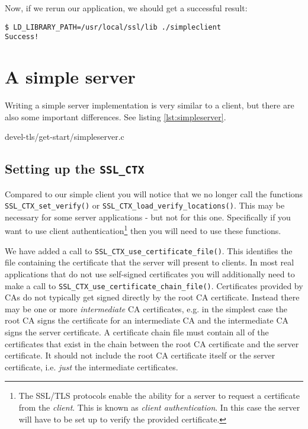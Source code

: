 Now, if we rerun our application, we should get a successful result:

\begin{verbatim}
$ LD_LIBRARY_PATH=/usr/local/ssl/lib ./simpleclient
Success!
\end{verbatim}

\section{A simple server}

Writing a simple server implementation is very similar to a client, but there 
are also some important differences. See listing \ref{lst:simpleserver}.


{devel-tls/get-start/simpleserver.c}

\subsection{Setting up the \texttt{SSL\_CTX}}

Compared to our simple client you will notice that we no longer call the 
functions \verb!SSL_CTX_set_verify()! or \verb!SSL_CTX_load_verify_locations()!.
This may
be necessary for some server applications - but not for this one. Specifically 
if you want to use client authentication\footnote{The SSL/TLS protocols enable 
the ability for a server to request a certificate from the \emph{client}. This 
is known as \emph{client authentication}. In this case the server will have to 
be set up to verify the provided certificate.} then you will need to use these 
functions.

We have added a call to \verb!SSL_CTX_use_certificate_file()!. This identifies 
the file containing the certificate that the server will present to clients. In 
most real applications that do not use self-signed certificates you will 
additionally need to make a call to 
\verb!SSL_CTX_use_certificate_chain_file()!. Certificates provided by CAs do 
not typically get signed directly by the root CA certificate. Instead there may 
be one or more \emph{intermediate} CA certificates, e.g. in the simplest case 
the root CA signs the certificate for an intermediate CA and the intermediate 
CA signs the server certificate. A certificate chain file must contain all of 
the certificates that exist in the chain between the root CA certificate and the
server certificate. It should not include the root CA certificate itself or the
server certificate, i.e. \emph{just} the intermediate certificates.

